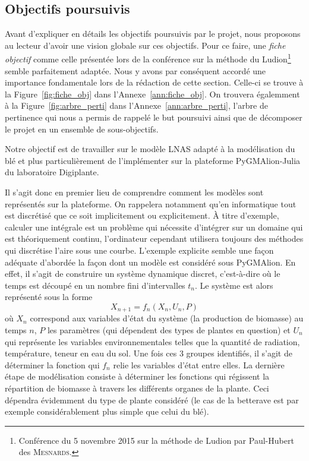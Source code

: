 \subsection{Objectifs poursuivis}
Avant d'expliquer en détails les objectifs poursuivis par le projet,
nous proposons au lecteur d'avoir une vision globale sur ces objectifs.
Pour ce faire, une \emph{fiche objectif} comme celle présentée 
lors de la conférence sur 
la méthode du Ludion\footnote{Conférence du 5 novembre 2015 
sur la méthode de Ludion par Paul-Hubert des \textsc{Mesnards}.} 
semble parfaitement adaptée.
Nous y avons par conséquent accordé une importance fondamentale
lors de la rédaction de cette section.
Celle-ci se trouve à la Figure~\ref{fig:fiche_obj} 
dans l'Annexe~\ref{ann:fiche_obj}.
On trouvera égalemment à la Figure~\ref{fig:arbre_perti}
dans l'Annexe~\ref{ann:arbre_perti}, l'arbre de pertinence
qui nous a permis de rappelé le but poursuivi ainsi
que de décomposer le projet en un ensemble de sous-objectifs.

Notre objectif est de travailler sur le modèle LNAS
adapté à la modélisation du blé et plus particulièrement de l'implémenter
sur la plateforme PyGMAlion-Julia du laboratoire Digiplante.


Il s'agit donc en premier lieu de comprendre comment les modèles
sont représentés sur la plateforme. 
On rappelera notamment qu'en informatique tout est discrétisé
que ce soit implicitement ou explicitement.
À titre d'exemple, calculer une intégrale est un problème
qui nécessite d'intégrer sur un domaine qui est théoriquement continu,
l'ordinateur cependant utilisera toujours des méthodes qui discrétise
l'aire sous une courbe.
L'exemple explicite semble une façon adéquate d'abordée
la façon dont un modèle est considéré sous PyGMAlion.
En effet, il s'agit de construire un système dynamique discret,
c'est-à-dire où le temps est découpé en un nombre fini d'intervalles $t_n$.
Le système est alors représenté sous la forme
\[
  X_{n+1} = f_n(X_n, U_n, P)
\]
où $X_n$ correspond aux variables d'état du système (la production
de biomasse) au temps $n$, $P$ les paramètres (qui dépendent des types
de plantes en question) et $U_n$ qui représente les variables
environnementales telles que la quantité de radiation, température,
teneur en eau du sol.
Une fois ces 3 groupes identifiés, il s'agit de déterminer la fonction
qui $f_n$ relie les variables d'état entre elles.
La dernière étape de modélisation consiste à déterminer
les fonctions qui régissent la répartition de biomasse 
à travers les différents organes de la plante.
Ceci dépendra évidemment du type de plante considéré
(le cas de la betterave est par exemple considérablement
plus simple que celui du blé).

